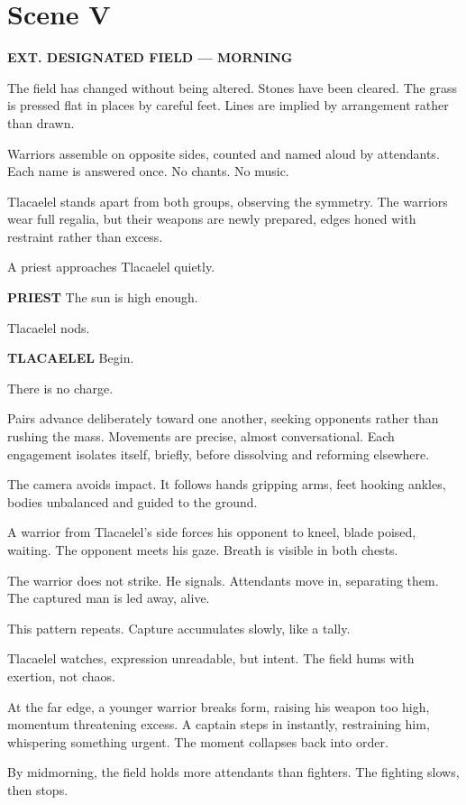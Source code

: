 \documentclass[12pt]{article}
\begin{document}
\section*{Scene V}

\textbf{EXT. DESIGNATED FIELD --- MORNING}

The field has changed without being altered. Stones have been cleared. The grass is pressed flat in places by careful feet. Lines are implied by arrangement rather than drawn.

Warriors assemble on opposite sides, counted and named aloud by attendants. Each name is answered once. No chants. No music.

Tlacaelel stands apart from both groups, observing the symmetry. The warriors wear full regalia, but their weapons are newly prepared, edges honed with restraint rather than excess.

A priest approaches Tlacaelel quietly.

\textbf{PRIEST}  
The sun is high enough.

Tlacaelel nods.

\textbf{TLACAELEL}  
Begin.

There is no charge.

Pairs advance deliberately toward one another, seeking opponents rather than rushing the mass. Movements are precise, almost conversational. Each engagement isolates itself, briefly, before dissolving and reforming elsewhere.

The camera avoids impact. It follows hands gripping arms, feet hooking ankles, bodies unbalanced and guided to the ground.

A warrior from Tlacaelel’s side forces his opponent to kneel, blade poised, waiting. The opponent meets his gaze. Breath is visible in both chests.

The warrior does not strike. He signals. Attendants move in, separating them. The captured man is led away, alive.

This pattern repeats. Capture accumulates slowly, like a tally.

Tlacaelel watches, expression unreadable, but intent. The field hums with exertion, not chaos.

At the far edge, a younger warrior breaks form, raising his weapon too high, momentum threatening excess. A captain steps in instantly, restraining him, whispering something urgent. The moment collapses back into order.

By midmorning, the field holds more attendants than fighters. The fighting slows, then stops.
\end{document}
